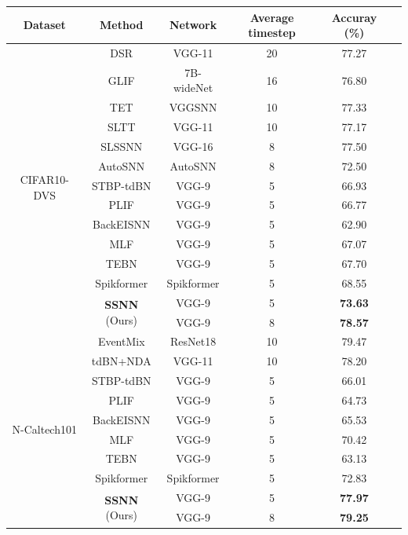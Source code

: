 \documentclass[letterpaper]{article} %
\begin{document}
\begin{table}[!tb]
 \centering
 \begin{threeparttable}
 \begin{tabular}{cccccc}
  \toprule
 Dataset & Method & Network & Average timestep & Accuray (\%)\\
  \midrule
  \multirow{14}{*}{CIFAR10-DVS}
  &DSR \cite{DSR} & VGG-11\tnote{$\dag$} & 20 & 77.27 \\
  &GLIF \cite{GLIF} & 7B-wideNet & 16 & 76.80 \\
  &TET \cite{TET} & VGGSNN & 10 & 77.33 \\
  &SLTT \cite{SLTT} & VGG-11 & 10 & 77.17 \\
  &SLSSNN \cite{SLSSNN} & VGG-16 & 8 & 77.50 \\
  &AutoSNN \cite{AutoSNN} & AutoSNN\tnote{$\dag$} & 8 & 72.50 \\
  \cline{2-5}
  & STBP-tdBN \cite{tdBN_2021} & VGG-9\tnote{*} & 5 & 66.93 \\
  & PLIF \cite{PLIF} & VGG-9\tnote{*} & 5 & 66.77 \\
  & BackEISNN \cite{BackEISNN} & VGG-9\tnote{*} & 5 & 62.90 \\
  & MLF \cite{MLF} & VGG-9\tnote{*} & 5 & 67.07 \\
  & TEBN \cite{TEBN} & VGG-9\tnote{*} & 5 & 67.70 \\
  &Spikformer \cite{Spikformer} & Spikformer\tnote{*$\dag$} & 5 & 68.55 \\
  \cline{2-5}
  &\multirow{2}{*}{\textbf{SSNN} (Ours)}  & VGG-9 & 5 & \textbf{73.63} \\&& VGG-9 & 8 & \textbf{78.57}\\
  \hline
  \multirow{10}{*}{N-Caltech101}
  &EventMix \cite{eventmix} & ResNet18\tnote{$\dag$} & 10 & 79.47 \\
  &tdBN+NDA \cite{NDA} & VGG-11\tnote{$\dag$} & 10 & 78.20 \\
  \cline{2-5}
  &STBP-tdBN \cite{tdBN_2021}  & VGG-9\tnote{*} & 5 & 66.01 \\
  &PLIF \cite{PLIF}  & VGG-9\tnote{*} & 5 & 64.73 \\
  &BackEISNN \cite{BackEISNN} & VGG-9\tnote{*} & 5 & 65.53 \\
  &MLF \cite{MLF} & VGG-9\tnote{*} & 5 & 70.42 \\
  &TEBN \cite{TEBN} & VGG-9\tnote{*} & 5 & 63.13 \\
  &Spikformer \cite{Spikformer} & Spikformer\tnote{*} & 5 & 72.83 \\
  \cline{2-5}
  &\multirow{2}{*}{\textbf{SSNN} (Ours)}  & VGG-9 & 5 & \textbf{77.97} \\&& VGG-9 & 8 & \textbf{79.25}\\

\end{tabular}
\end{threeparttable}
\end{table}
\end{document}
